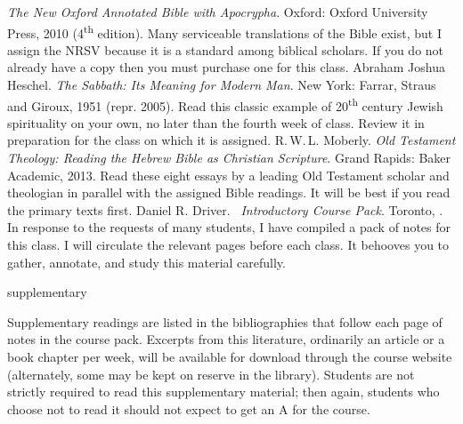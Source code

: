 \documentclass[titlepage]{article}
\begin{document}
\begingroup
\renewcommand{\section}[2]{}%
\begin{thebibliography}{Heschel}%
   \emph{The New Oxford Annotated Bible with Apocrypha}.
    Oxford: Oxford University Press, 2010 (4\textsuperscript{th}
    edition). Many serviceable translations of the Bible exist, but I
    assign the NRSV because it is a standard among biblical scholars. If
    you do not already have a copy then you must purchase one for this
    class.
   Abraham Joshua Heschel.
    \emph{The Sabbath: Its Meaning for Modern Man}. New York: Farrar,
    Straus and Giroux, 1951 (repr. 2005). Read this classic example of
    20\textsuperscript{th} century Jewish spirituality on your own, no
    later than the fourth week of class. Review it in preparation for the
    class on which it is assigned.
   R.\,W.\,L. Moberly.
    \emph{Old Testament Theology: Reading the Hebrew Bible as Christian
    Scripture}. Grand Rapids: Baker Academic, 2013. Read these eight
    essays by a leading Old Testament scholar and theologian in parallel
    with the assigned Bible readings. It will be best if you read the
    primary texts first.
   Daniel R. Driver.
    \emph{\ctitle\ Introductory Course Pack}. Toronto, \csemester.
    In response to the requests of many students, I have compiled a pack
    of notes for this class. I will circulate the relevant pages before
    each class. It behooves you to gather, annotate, and study this
    material carefully.
\end{thebibliography}
\endgroup

\section{Supplementary Texts}
\label{supplementary}

Supplementary readings are listed in the bibliographies that follow each
page of notes in the course pack. Excerpts from this literature,
ordinarily an article or a book chapter per week, will be available for
download through the course website (alternately, some may be kept on
reserve in the library). Students are not strictly required to read this
supplementary material; then again, students who choose not to read it
should not expect to get an A for the course.
\end{document}
